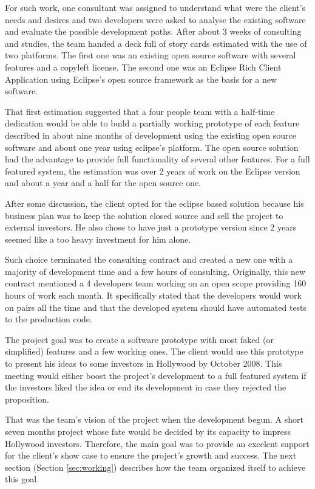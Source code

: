 \documentclass[lnbip]{svmultln}
\begin{document}
For such work, one consultant was assigned to understand what were the
client's needs and desires and two developers were asked to analyse
the existing software and evaluate the possible development
paths. After about 3 weeks of consulting and studies, the team handed
a deck full of story cards estimated with the use of two
platforms. The first one was an existing open source software with
several features and a copyleft license. The second one was an Eclipse
Rich Client Application using Eclipse's open source framework as the
basis for a new software.

That first estimation suggested that a four people team with a
half-time dedication would be able to build a partially working
prototype of each feature described in about nine months of
development using the existing open source software and about one year
using eclipse's platform. The open source solution had the advantage
to provide full functionality of several other features.  For a full
featured system, the estimation was over 2 years of work on the
Eclipse version and about a year and a half for the open source one.

After some discussion, the client opted for the eclipse based solution
because his business plan was to keep the solution closed source and
sell the project to external investors. He also chose to have just a
prototype version since 2 years seemed like a too heavy investment for
him alone.

Such choice terminated the consulting contract and created a new one
with a majority of development time and a few hours of
consulting. Originally, this new contract mentioned a 4 developers
team working on an open scope providing 160 hours of work each
month. It specifically stated that the developers would work on pairs
all the time and that the developed system should have automated tests
to the production code.

The project goal was to create a software prototype with most faked
(or simplified) features and a few working ones. The client would use
this prototype to present his ideas to some investors in Hollywood by
October 2008. This meeting would either boost the project's
development to a full featured system if the investors liked the idea
or end its development in case they rejected the proposition.

That was the team's vision of the project when the development
begun. A short seven months project whose fate would be decided by its
capacity to impress Hollywood investors. Therefore, the main goal was
to provide an excelent support for the client's show case to ensure
the project's growth and success. The next section (Section
\ref{sec:working}) describes how the team organized itself to achieve
this goal.
\end{document}

